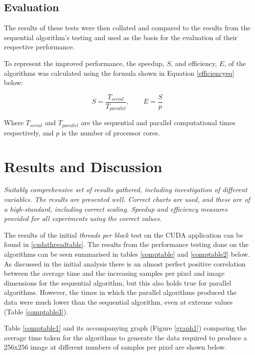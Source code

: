 \documentclass[12pt,journal,transmag]{IEEEtran}
\begin{document}
	\subsection{Evaluation}
	The results of these tests were then collated and compared to the results from the sequential algorithm's testing and used as the basis for the evaluation of their respective performance.
	
	To represent the improved performance, the speedup, $S$, and efficiency, $E$, of the algorithms was calculated using the formula shown in Equation \ref{efficiencyeq} below:
	
	\begin{equation} \label{efficiencyeq} 
		S = \dfrac{T_{serial}}{T_{parallel}}, \qquad E = \dfrac{S}{p}
	\end{equation}
	
	Where $T_{serial}$ and $T_{parallel}$ are the sequential and parallel computational times respectively, and $p$ is the number of processor cores.
	
	\section{Results and Discussion}
	
	\textit{Suitably comprehensive set of results gathered, including investigation of different variables. The results are presented well. Correct charts are used, and these are of a high-standard, including correct scaling. Speedup and efficiency measures provided for all experiments using the correct values.}
	
	The results of the initial \textit{threads per block} test on the CUDA application can be found in \ref{cudathreadtable}.
	The results from the performance testing done on the algorithms can be seen summarised in tables \ref{comptable} and \ref{comptable2} below. As discussed in the initial analysis there is an almost perfect positive correlation between the average time and the increasing samples per pixel and image dimensions for the sequential algorithm, but this also holds true for parallel algorithms. However, the times in which the parallel algorithms produced the data were much lower than the sequential algorithm, even at extreme values (Table \ref{comptable3}).
	
	Table \ref{comptable1} and its accompanying graph (Figure \ref{graph1}) comparing the average time taken for the algorithms to generate the data required to produce a 256x256 image at different numbers of samples per pixel are shown below.
	
\end{document}
